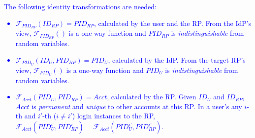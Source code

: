 \textcolor{blue}{The following identity transformations %
    are needed: %
\vspace{-\topsep}\begin{itemize}
\setlength{\topsep}{0pt}
\setlength{\partopsep}{0pt}
\setlength{\itemsep}{0pt}
\setlength{\parsep}{0pt}
\setlength{\parskip}{0pt}
\item
$\mathcal{F}_{PID_{RP}}(ID_{RP}) = PID_{RP}$, calculated by the user and the RP.
From the IdP's view,
$\mathcal{F}_{PID_{RP}}()$ is a one-way function and $PID_{RP}$
is \emph{indistinguishable} from random variables.
\item
$\mathcal{F}_{PID_U}(ID_U, PID_{RP}) = PID_{U}$, calculated by the IdP.
From the target RP's view,
    $\mathcal{F}_{PID_U}()$ is a one-way function and $PID_{U}$ is \emph{indistinguishable} from random variables.
\item
$\mathcal{F}_{Acct}(PID_{U}, PID_{RP}) = Acct$, calculated by the RP.
Given $ID_U$ and $ID_{RP}$, $Acct$ is \emph{permanent} and \emph{unique} to other accounts at this RP.
In a user's any $i$-th and $i'$-th ($i \neq i'$) login instances to the RP,
 $\mathcal{F}_{Acct}(PID_{U}^i, PID_{RP}^i) = \mathcal{F}_{Acct}(PID_{U}^{i'}, PID_{RP}^{i'})$.
\end{itemize}}

